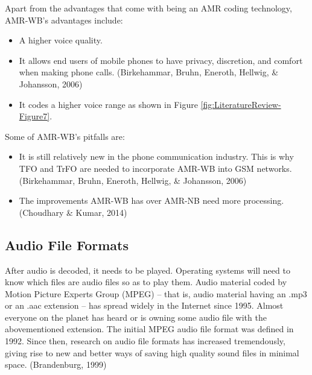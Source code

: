 \documentclass[12pt,svgnames,smaller]{article} %
\begin{document}
\begin{enumerate}
		Apart from the advantages that come with being an AMR coding technology, AMR-WB’s advantages include:
		
		\begin{itemize}
			\item A higher voice quality.
			\item It allows end users of mobile phones to have privacy, discretion, and comfort when making phone calls. (Birkehammar, Bruhn, Eneroth, Hellwig, \& Johansson, 2006)
			\item It codes a higher voice range as shown in Figure \ref{fig:LiteratureReview-Figure7}. 
		\end{itemize}
		
		Some of AMR-WB’s pitfalls are:
		
		\begin{itemize}
			\item It is still relatively new in the phone communication industry. This is why TFO and TrFO are needed to incorporate AMR-WB into GSM networks. (Birkehammar, Bruhn, Eneroth, Hellwig, \& Johansson, 2006)
			\item The improvements AMR-WB has over AMR-NB need more processing. (Choudhary \& Kumar, 2014)
		\end{itemize}
		
		
	\end{enumerate}
	
	
	\subsection{\textbf{Audio File Formats}}
	
	After audio is decoded, it needs to be played. Operating systems will need to know which files are audio files so as to play them. Audio material coded by Motion Picture Experts Group (MPEG) – that is, audio material having an .mp3 or an .aac extension – has spread widely in the Internet since 1995. Almost everyone on the planet has heard or is owning some audio file with the abovementioned extension. The initial MPEG audio file format was defined in 1992. Since then, research on audio file formats has increased tremendously, giving rise to new and better ways of saving high quality sound files in minimal space. (Brandenburg, 1999)
	
\end{document}
